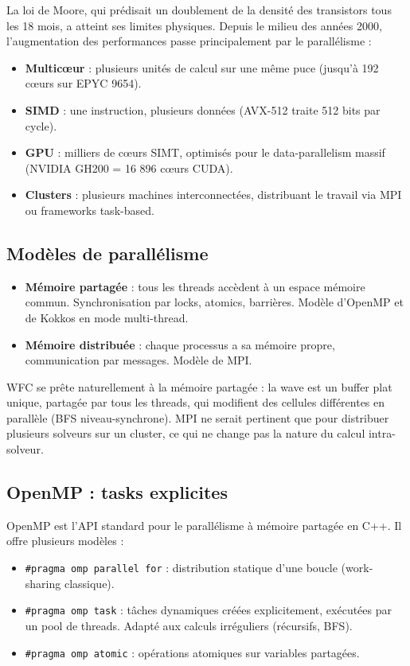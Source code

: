 La loi de Moore, qui prédisait un doublement de la densité des transistors tous les 18 mois, a atteint ses limites physiques. Depuis le milieu des années 2000, l'augmentation des performances passe principalement par le parallélisme :
\begin{itemize}
    \item \textbf{Multicœur} : plusieurs unités de calcul sur une même puce (jusqu'à 192 cœurs sur EPYC 9654).
    \item \textbf{SIMD} : une instruction, plusieurs données (AVX-512 traite 512 bits par cycle).
    \item \textbf{GPU} : milliers de cœurs SIMT, optimisés pour le data-parallelism massif (NVIDIA GH200 = 16 896 cœurs CUDA).
    \item \textbf{Clusters} : plusieurs machines interconnectées, distribuant le travail via MPI ou frameworks task-based.
\end{itemize}

\subsection{Modèles de parallélisme}

\begin{definition}
\begin{itemize}
    \item \textbf{Mémoire partagée} : tous les threads accèdent à un espace mémoire commun. Synchronisation par locks, atomics, barrières. Modèle d'OpenMP et de Kokkos en mode multi-thread.
    \item \textbf{Mémoire distribuée} : chaque processus a sa mémoire propre, communication par messages. Modèle de MPI.
\end{itemize}
\end{definition}

WFC se prête naturellement à la mémoire partagée : la wave est un buffer plat unique, partagée par tous les threads, qui modifient des cellules différentes en parallèle (BFS niveau-synchrone). MPI ne serait pertinent que pour distribuer plusieurs solveurs sur un cluster, ce qui ne change pas la nature du calcul intra-solveur.

\subsection{OpenMP : tasks explicites}

OpenMP \cite{openmp45} est l'API standard pour le parallélisme à mémoire partagée en C++. Il offre plusieurs modèles :
\begin{itemize}
    \item \texttt{\#pragma omp parallel for} : distribution statique d'une boucle (work-sharing classique).
    \item \texttt{\#pragma omp task} : tâches dynamiques créées explicitement, exécutées par un pool de threads. Adapté aux calculs irréguliers (récursifs, BFS).
    \item \texttt{\#pragma omp atomic} : opérations atomiques sur variables partagées.
\end{itemize}


